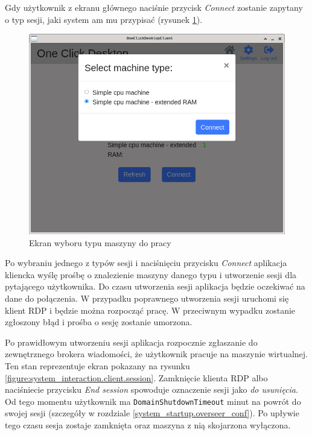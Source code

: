 \documentclass[../opis-rozwiazania.tex]{subfiles}
\begin{document}
Gdy użytkownik z ekranu głównego naciśnie przycisk \textit{Connect} zostanie zapytany o typ sesji, jaki system am mu przypisać (rysunek \ref{figure:system_interaction.client.select}).

\begin{figure}[H]
	\centering
	\includegraphics[width=\textwidth]{resources/client_select.png}
	\caption{Ekran wyboru typu maszyny do pracy}
	\label{figure:system_interaction.client.select}
\end{figure}

Po wybraniu jednego z typów sesji i naciśnięciu przycisku \textit{Connect} aplikacja kliencka wyślę prośbę o znalezienie maszyny danego typu i utworzenie sesji dla pytającego użytkownika.
Do czasu utworzenia sesji aplikacja będzie oczekiwać na dane do połączenia.
W przypadku poprawnego utworzenia sesji uruchomi się klient RDP i będzie można rozpocząć pracę.
W przeciwnym wypadku zostanie zgłoszony błąd i prośba o sesję zostanie umorzona.

Po prawidłowym utworzeniu sesji aplikacja rozpocznie zgłaszanie do zewnętrznego brokera wiadomości, że użytkownik pracuje na maszynie wirtualnej.
Ten stan reprezentuje ekran pokazany na rysunku \ref{figure:system_interaction.client.session}.
Zamknięcie klienta RDP albo naciśniecie przycisku \textit{End session} spowoduje oznaczenie sesji jako \textit{do usunięcia}.
Od tego momentu użytkownik ma \texttt{DomainShutdownTimeout} minut na powrót do swojej sesji (szczegóły w rozdziale \ref{system_startup.overseer_conf}).
Po upływie tego czasu sesja zostaje zamknięta oraz maszyna z nią skojarzona wyłączona.
\end{document}

